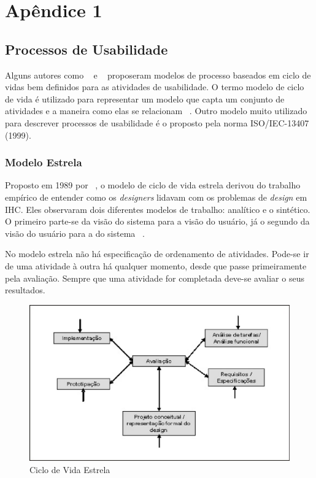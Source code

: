 \newpage
\appendix
\chapter{Apêndice 1}
\label{apendice1}

\section{Processos de Usabilidade}


	Alguns autores como ~ e ~ proposeram modelos de processo baseados em ciclo de vidas bem definidos para as atividades de usabilidade. O termo modelo de ciclo de vida é utilizado para representar um modelo que capta um conjunto de atividades e a maneira como elas se relacionam ~\cite{preece2007}. 
	Outro modelo muito utilizado para descrever processos de usabilidade é o proposto pela norma ISO/IEC-13407 (1999).

\subsection{Modelo Estrela}

	Proposto em 1989 por ~\citeauthor{hix1993}, o modelo de ciclo de vida estrela derivou do trabalho empírico de entender como os \emph{designers} lidavam com os problemas de \emph{design} em IHC. Eles observaram dois diferentes modelos de trabalho: analítico e o sintético. O primeiro parte-se da visão do sistema para a visão do usuário, já o segundo da visão do usuário para a do sistema ~\cite{cybis2010}.

	No modelo estrela não há especificação de ordenamento de atividades. Pode-se ir de uma atividade à outra há qualquer momento, desde que passe primeiramente pela avaliação. Sempre que uma atividade for completada deve-se avaliar o seus resultados.

\begin{figure}[h]
    \centering
    \includegraphics[keepaspectratio=true,scale=0.60]
      {figuras/estrela.eps}
    \caption{Ciclo de Vida Estrela}
    \label{ciclo_estrela}
\end{figure}


